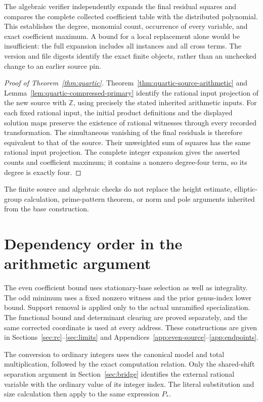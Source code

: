 \documentclass[11pt]{article}
\theoremstyle{definition}
\theoremstyle{remark}
\newcommand{\Z}{\mathbb Z}
\begin{document}
The algebraic verifier independently expands the final residual squares and
compares the complete collected coefficient table with the distributed
polynomial. This establishes the degree, monomial count, occurrence of every
variable, and exact coefficient maximum. A bound for a local replacement
alone would be insufficient: the full expansion includes all instances and
all cross terms. The version and file digests identify the exact finite
objects, rather than an unchecked change to an earlier source pin.

\begin{proof}[Proof of Theorem~\ref{thm:quartic}]
Theorem~\ref{thm:quartic-source-arithmetic} and
Lemma~\ref{lem:quartic-compressed-primary} identify the rational input
projection of the new source with $\Z$, using precisely the stated inherited
arithmetic inputs. For each fixed rational input, the initial product
definitions and the displayed solution maps preserve the existence of
rational witnesses through every recorded transformation. The simultaneous
vanishing of the final residuals is therefore equivalent to that of the
source. Their unweighted sum of squares has the same rational input
projection. The complete integer expansion gives the asserted counts and
coefficient maximum; it contains a nonzero degree-four term, so its degree
is exactly four.
\end{proof}

The finite source and algebraic checks do not replace the height estimate,
elliptic-group calculation, prime-pattern theorem, or norm and pole arguments
inherited from the base construction.

\appendix
\section{Dependency order in the arithmetic argument}\label{app:obligations}
The even coefficient bound uses stationary-base selection as well as
integrality. The odd minimum uses a fixed nonzero witness and the prior
genus-index lower bound. Support removal is applied only to the actual
unramified specialization. The functional bound and determinant clearing
are proved separately, and the same corrected coordinate is used at every
address. These constructions are given in Sections~\ref{sec:rc}--\ref{sec:limits}
and Appendices~\ref{app:even-source}--\ref{app:endpoints}.

The conversion to ordinary integers uses the canonical model and total
multiplication, followed by the exact computation relation. Only the
shared-shift separation argument in Section~\ref{sec:bridge} identifies
the external rational variable with the ordinary value of its integer
index. The literal substitution and size calculation then apply to the
same expression $P_*$.
\end{document}
